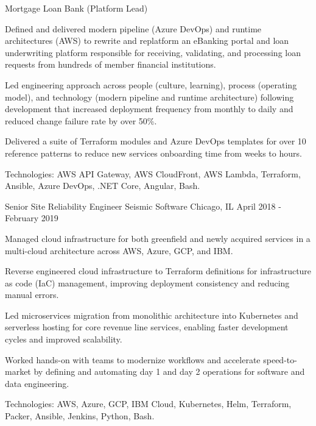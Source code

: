 \begin{cventries}
  \cventry
    {Mortgage Loan Bank (Platform Lead)} %
    {} %
    {} %
    {} %
    {
      \begin{cvitems} %
        \item {Defined and delivered modern pipeline (Azure DevOps) and runtime architectures (AWS) to rewrite and replatform an eBanking portal and loan underwriting platform responsible for receiving, validating, and processing loan requests from hundreds of member financial institutions.}
        \item {Led engineering approach across people (culture, learning), process (operating model), and technology (modern pipeline and runtime architecture) following development that increased deployment frequency from monthly to daily and reduced change failure rate by over 50\%.}
        \item {Delivered a suite of Terraform modules and Azure DevOps templates for over 10 reference patterns to reduce new services onboarding time from weeks to hours.}
        \item {Technologies: AWS API Gateway, AWS CloudFront, AWS Lambda, Terraform, Ansible, Azure DevOps, .NET Core, Angular, Bash.}
      \end{cvitems}
    }

  \cventry
    {Senior Site Reliability Engineer} %
    {Seismic Software} %
    {Chicago, IL} %
    {April 2018 - February 2019} %
    {
      \begin{cvitems} %
        \item {Managed cloud infrastructure for both greenfield and newly acquired services in a multi-cloud architecture across AWS, Azure, GCP, and IBM.}
        \item {Reverse engineered cloud infrastructure to Terraform definitions for infrastructure as code (IaC) management, improving deployment consistency and reducing manual errors.}
        \item {Led microservices migration from monolithic architecture into Kubernetes and serverless hosting for core revenue line services, enabling faster development cycles and improved scalability.}
        \item {Worked hands-on with teams to modernize workflows and accelerate speed-to-market by defining and automating day 1 and day 2 operations for software and data engineering.}
        \item {Technologies: AWS, Azure, GCP, IBM Cloud, Kubernetes, Helm, Terraform, Packer, Ansible, Jenkins, Python, Bash.}
      \end{cvitems}
    }


\end{cventries}

